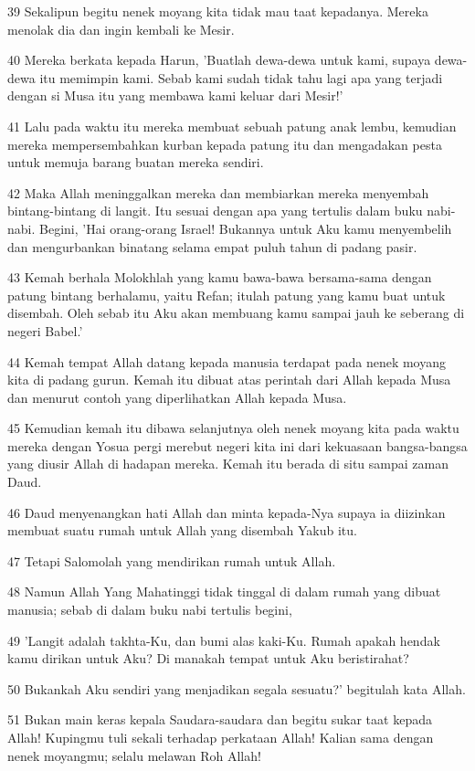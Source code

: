 \par 39 Sekalipun begitu nenek moyang kita tidak mau taat kepadanya. Mereka menolak dia dan ingin kembali ke Mesir.
\par 40 Mereka berkata kepada Harun, 'Buatlah dewa-dewa untuk kami, supaya dewa-dewa itu memimpin kami. Sebab kami sudah tidak tahu lagi apa yang terjadi dengan si Musa itu yang membawa kami keluar dari Mesir!'
\par 41 Lalu pada waktu itu mereka membuat sebuah patung anak lembu, kemudian mereka mempersembahkan kurban kepada patung itu dan mengadakan pesta untuk memuja barang buatan mereka sendiri.
\par 42 Maka Allah meninggalkan mereka dan membiarkan mereka menyembah bintang-bintang di langit. Itu sesuai dengan apa yang tertulis dalam buku nabi-nabi. Begini, 'Hai orang-orang Israel! Bukannya untuk Aku kamu menyembelih dan mengurbankan binatang selama empat puluh tahun di padang pasir.
\par 43 Kemah berhala Molokhlah yang kamu bawa-bawa bersama-sama dengan patung bintang berhalamu, yaitu Refan; itulah patung yang kamu buat untuk disembah. Oleh sebab itu Aku akan membuang kamu sampai jauh ke seberang di negeri Babel.'
\par 44 Kemah tempat Allah datang kepada manusia terdapat pada nenek moyang kita di padang gurun. Kemah itu dibuat atas perintah dari Allah kepada Musa dan menurut contoh yang diperlihatkan Allah kepada Musa.
\par 45 Kemudian kemah itu dibawa selanjutnya oleh nenek moyang kita pada waktu mereka dengan Yosua pergi merebut negeri kita ini dari kekuasaan bangsa-bangsa yang diusir Allah di hadapan mereka. Kemah itu berada di situ sampai zaman Daud.
\par 46 Daud menyenangkan hati Allah dan minta kepada-Nya supaya ia diizinkan membuat suatu rumah untuk Allah yang disembah Yakub itu.
\par 47 Tetapi Salomolah yang mendirikan rumah untuk Allah.
\par 48 Namun Allah Yang Mahatinggi tidak tinggal di dalam rumah yang dibuat manusia; sebab di dalam buku nabi tertulis begini,
\par 49 'Langit adalah takhta-Ku, dan bumi alas kaki-Ku. Rumah apakah hendak kamu dirikan untuk Aku? Di manakah tempat untuk Aku beristirahat?
\par 50 Bukankah Aku sendiri yang menjadikan segala sesuatu?' begitulah kata Allah.
\par 51 Bukan main keras kepala Saudara-saudara dan begitu sukar taat kepada Allah! Kupingmu tuli sekali terhadap perkataan Allah! Kalian sama dengan nenek moyangmu; selalu melawan Roh Allah!
